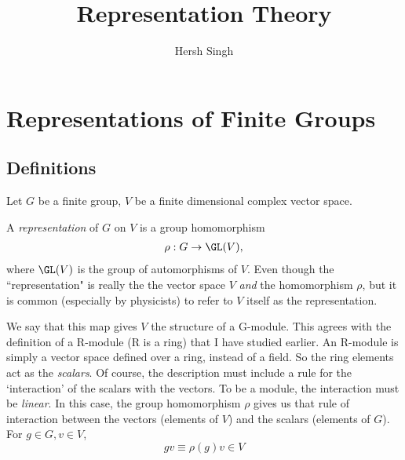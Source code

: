 

\usepackage[vcentermath]{youngtab} %
\setcounter{secnumdepth}{1}

\DeclareMathOperator{\Sym}{Sym} %
\DeclareMathOperator{\Alt}{\Lambda} %
\DeclareMathOperator{\sgn}{sgn} %
\DeclareMathOperator{\triv}{triv} %
\DeclareMathOperator{\std}{std} %
\DeclareMathOperator{\Ind}{Ind} %


\title{Representation Theory}
\author{Hersh Singh}

\maketitle

\tableofcontents

\chapter{Representations of Finite Groups}
\section{Definitions}
\label{sec:definitions}

Let $G$ be a finite group, $V$ be a finite dimensional complex vector space.

A \emph{representation} of $G$ on $V$ is a group homomorphism 
\begin{align}
    \rho:  G\to \GL(V), 
\end{align}
where $\GL(V)$ is the group of automorphisms of $V$. Even though the ``representation" is really the the vector space $V$ \emph{and} the homomorphism $\rho$, but it is common (especially by physicists) to refer to $V$ itself as the representation. 

\begin{insight}
We say that this map gives $V$ the structure of a G-module. This agrees with the  definition of a R-module (R is a ring) that I have studied earlier. An R-module is simply a vector space defined over a ring, instead of a field. So the ring elements act as the \emph{scalars}. Of course, the description must include a rule for the `interaction' of the scalars with the vectors. To be a module, the interaction must be \emph{linear}.  
In this case, the group homomorphism $\rho$ gives us that rule of interaction between the vectors (elements of $V$) and the scalars (elements of $G$). For $g\in G, v \in V$, $$gv\equiv\rho(g)v \in V$$
\end{insight}


